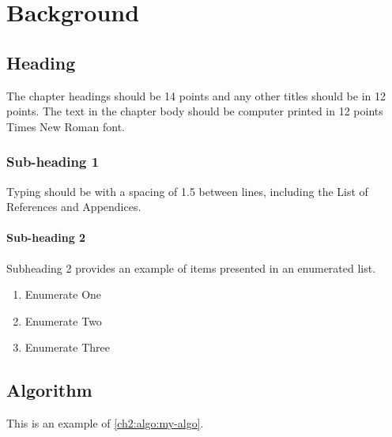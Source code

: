 \chapter{Background}		
\label{chapter2}


\section{Heading}

\begin{paragraph}
The chapter headings should be 14 points and any other titles should be in 12 points.  The text in the chapter body should be computer printed in 12 points Times New Roman font.
\end{paragraph}

\subsection{Sub-heading 1}

\begin{subparagraph}
Typing should be with a spacing of 1.5 between lines, including the List of References and Appendices.
\end{subparagraph}






\subsubsection{Sub-heading 2}

\begin{subsubparagraph}
Subheading 2 provides an example of items presented in an enumerated list.
\end{subsubparagraph}

\begin{enumerate}[itemindent=\subsubparitemindent]
\item Enumerate One
\item Enumerate Two
\item Enumerate Three
\end{enumerate}





\section{Algorithm}

\begin{paragraph}
This is an example of \autoref{ch2:algo:my-algo}.
\end{paragraph}

